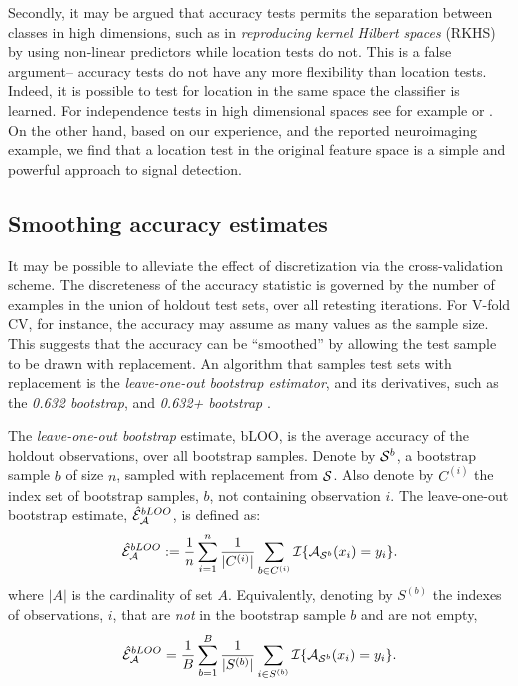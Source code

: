 \documentclass[12pt,a4paper]{article}
\begin{document}
Secondly, it may be argued that accuracy tests permits the separation between classes in high dimensions, such as in \emph{reproducing kernel Hilbert spaces} (RKHS) by using non-linear predictors while location tests do not. 
This is a false argument-- accuracy tests do not have any more flexibility than location tests. 
Indeed, it is possible to test for location in the same space the classifier is learned. 
For independence tests in high dimensional spaces see for example \cite{szekely_brownian_2009} or \citet{gretton_kernel_2012-1}.
On the other hand, based on our experience, and the reported neuroimaging example, we find that a location test in the original feature space is a simple and powerful approach to signal detection.










\subsection{Smoothing accuracy estimates}
\label{sec:bootstrap}
It may be possible to alleviate the effect of discretization via the cross-validation scheme.
The discreteness of the accuracy statistic is governed by the number of examples in the union of holdout test sets, over all retesting iterations.
For V-fold CV, for instance, the accuracy may assume as many values as the sample size. 
This suggests that the accuracy can be ``smoothed'' by allowing the test sample to be drawn with replacement. 
An algorithm that samples test sets with replacement is the \emph{leave-one-out bootstrap estimator},  and its derivatives, such as the \emph{0.632 bootstrap}, and \emph{0.632+ bootstrap} \citep[Sec 7.11]{hastie_elements_2003}.
\begin{definition}[bLOO]
\label{def:bloo}
The \emph{leave-one-out bootstrap} estimate, bLOO, is the average accuracy of the holdout observations, over all bootstrap samples. 
Denote by $\mathcal{S}^b$, a bootstrap sample $b$ of size $n$, sampled with replacement from $\mathcal{S}$. 
Also denote by $C^{(i)}$ the index set of bootstrap samples, $b$, not containing observation $i$.
The leave-one-out bootstrap estimate, $\hat{\mathcal{E}}_{\mathcal{A}}^{bLOO}$,  is defined as:
\begin{align}
		\hat{\mathcal{E}}_{\mathcal{A}}^{bLOO}:= \frac 1n \sum_{i=1}^{n} \frac{1}{|C^{(i)}|} \sum_{b \in C^{(i)}} \mathcal{I}{\{ \mathcal{A}_{\mathcal{S}^b}(x_i)=y_i \}}.
\end{align}
where $|A|$ is the cardinality of set $A$.
Equivalently, denoting by $S^{(b)}$ the indexes of observations, $i$, that are \emph{not} in the bootstrap sample $b$ and are not empty, 
\begin{align}
	\hat{\mathcal{E}}_{\mathcal{A}}^{bLOO} = \frac 1B \sum_{b=1}^{B} \frac{1}{|S^{(b)}|} \sum_{i \in S^{(b)}} \mathcal{I}{\{ \mathcal{A}_{\mathcal{S}^b}(x_i)=y_i \}}.
\end{align}
\end{definition}
\end{document}
